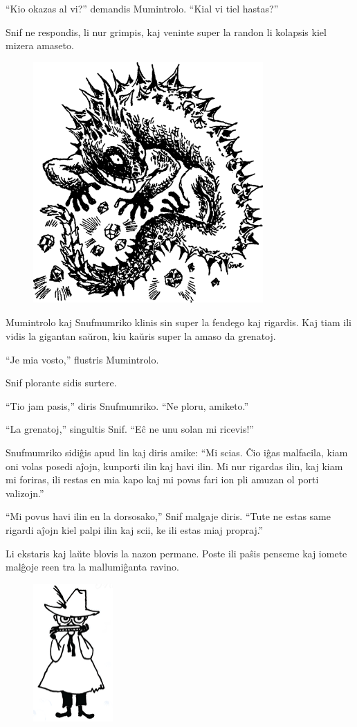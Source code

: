 ``Kio okazas al vi?'' demandis Mumintrolo. ``Kial vi tiel hastas?''

Snif ne respondis, li nur grimpis, kaj veninte super la randon li kolapsis kiel mizera amaseto.

\begin{figure}[htbp]
\centering
\includegraphics[width=249pt,height=261pt]{3-7.png}
\caption{}
\label{3-7}
\end{figure}

Mumintrolo kaj Snufmumriko klinis sin super la fendego kaj rigardis. Kaj tiam ili vidis la gigantan saŭron, kiu kaŭris super la amaso da grenatoj.

``Je mia vosto,'' flustris Mumintrolo.

Snif plorante sidis surtere.

``Tio jam pasis,'' diris Snufmumriko. ``Ne ploru, amiketo.''

``La grenatoj,'' singultis Snif. ``Eĉ ne unu solan mi ricevis!''

Snufmumriko sidiĝis apud lin kaj diris amike: ``Mi scias. Ĉio iĝas malfacila, kiam oni volas posedi aĵojn, kunporti ilin kaj havi ilin. Mi nur rigardas ilin, kaj kiam mi foriras, ili restas en mia kapo kaj mi povas fari ion pli amuzan ol porti valizojn.''

``Mi povus havi ilin en la dorsosako,'' Snif malgaje diris. ``Tute ne estas same rigardi aĵojn kiel palpi ilin kaj scii, ke ili estas miaj propraj.''

Li ekstaris kaj laŭte blovis la nazon permane. Poste ili paŝis penseme kaj iomete malĝoje reen tra la mallumiĝanta ravino.
\sectionbreak

\begin{figure}[htbp]
\centering
\includegraphics[width=86pt,height=150pt]{3-8.png}
\caption{}
\label{3-8}
\end{figure}

